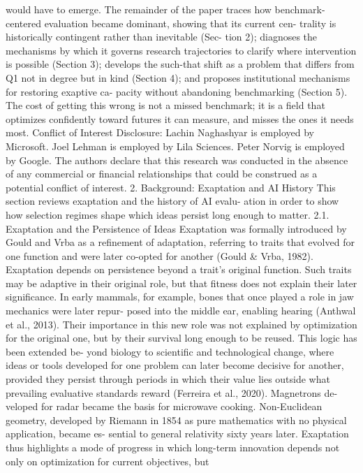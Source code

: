 would have to emerge.
The remainder of the paper traces how benchmark-centered
evaluation became dominant, showing that its current cen-
trality is historically contingent rather than inevitable (Sec-
tion 2); diagnoses the mechanisms by which it governs
research trajectories to clarify where intervention is possible
(Section 3); develops the such-that shift as a problem that
differs from Q1 not in degree but in kind (Section 4); and
proposes institutional mechanisms for restoring exaptive ca-
pacity without abandoning benchmarking (Section 5). The
cost of getting this wrong is not a missed benchmark; it
is a field that optimizes confidently toward futures it can
measure, and misses the ones it needs most.
Conflict of Interest Disclosure: Lachin Naghashyar is
employed by Microsoft. Joel Lehman is employed by Lila
Sciences. Peter Norvig is employed by Google. The authors
declare that this research was conducted in the absence
of any commercial or financial relationships that could be
construed as a potential conflict of interest.
2. Background: Exaptation and AI History
This section reviews exaptation and the history of AI evalu-
ation in order to show how selection regimes shape which
ideas persist long enough to matter.
2.1. Exaptation and the Persistence of Ideas
Exaptation was formally introduced by Gould and Vrba as
a refinement of adaptation, referring to traits that evolved
for one function and were later co-opted for another (Gould
\& Vrba, 1982). Exaptation depends on persistence beyond
a trait’s original function. Such traits may be adaptive in
their original role, but that fitness does not explain their
later significance. In early mammals, for example, bones
that once played a role in jaw mechanics were later repur-
posed into the middle ear, enabling hearing (Anthwal et al.,
2013). Their importance in this new role was not explained
by optimization for the original one, but by their survival
long enough to be reused. This logic has been extended be-
yond biology to scientific and technological change, where
ideas or tools developed for one problem can later become
decisive for another, provided they persist through periods
in which their value lies outside what prevailing evaluative
standards reward (Ferreira et al., 2020). Magnetrons de-
veloped for radar became the basis for microwave cooking.
Non-Euclidean geometry, developed by Riemann in 1854 as
pure mathematics with no physical application, became es-
sential to general relativity sixty years later. Exaptation thus
highlights a mode of progress in which long-term innovation
depends not only on optimization for current objectives, but
